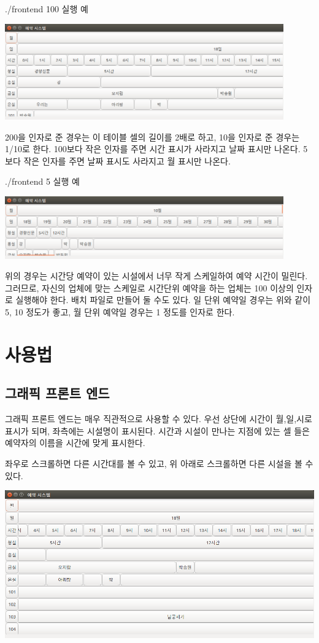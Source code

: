 \documentclass[12pt,a4paper]{report}
\begin{document}
./frontend 100 실행 예

\includegraphics[width=0.9\textwidth]{exec.png}

200을 인자로 준 경우는 이 테이블 셀의 길이를 2배로 하고, 10을 인자로 준 경우는 1/10로 한다. 100보다 작은 인자를 주면 시간 표시가 사라지고 날짜 표시만 나온다. 5보다 작은 인자를 주면 날짜 표시도 사라지고 월 표시만 나온다.

./frontend 5 실행 예

\includegraphics[width=0.9\textwidth]{mon.png}

위의 경우는 시간당 예약이 있는 시설에서 너무 작게 스케일하여 예약 시간이 밀린다.
그러므로, 자신의 업체에 맞는 스케일로 시간단위 예약을 하는 업체는 100 이상의 인자로 실행해야 한다. 배치 파일로 만들어 둘 수도 있다.
일 단위 예약일 경우는 위와 같이 5, 10 정도가 좋고,
월 단위 예약일 경우는 1 정도를 인자로 한다.

\chapter{사용법}

\section{그래픽 프론트 엔드}
그래픽 프론트 엔드는 매우 직관적으로 사용할 수 있다.
우선 상단에 시간이 월,일,시로 표시가 되며, 좌측에는 시설명이 표시된다.
시간과 시설이 만나는 지점에 있는 셀 들은 예약자의 이름을 시간에 맞게 표시한다.

좌우로 스크롤하면 다른 시간대를 볼 수 있고, 위 아래로 스크롤하면 다른 시설을 볼 수 있다.

\includegraphics[width=\textwidth]{scroll.png}
\end{document}
